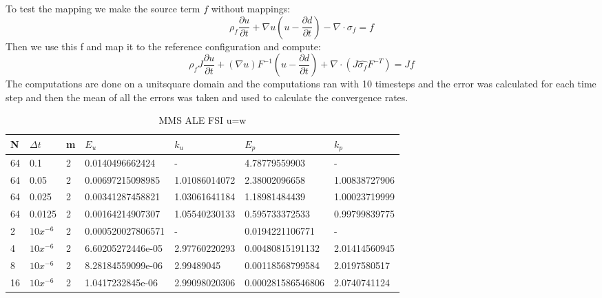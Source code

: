 To test the mapping we make the source term $f$ without mappings:
$$ \rho_f \frac{\partial u}{\partial t}  +  \nabla u (u-\frac{\partial d}{\partial t})  -  \nabla \cdot \sigma_f  = f $$
Then we use this f and map it to the reference configuration and compute:
$$ \rho_f J \frac{\partial u}{\partial t} + (\nabla u)F^{-1}(u-\frac{\partial d}{\partial t})  + \nabla \cdot( J \hat{\sigma_f} F^{-T}) = J f$$
The computations are done on a unitsquare domain and the computations ran with 10 timesteps and the error was calculated for each time step and then the mean of all the errors was taken and used to calculate the convergence rates.
\begin{table}[h!]
\centering
\caption{MMS ALE FSI u=w}
\label{my-label}
\begin{tabular}{|l|l|l|l|l|l|l|}
\hline
N & $\Delta t$ & m & $E_u$ & $k_u$ & $E_p$ & $k_p$ \\ \hline
64 & 0.1 & 2 & 0.0140496662424 & - & 4.78779559903 & - \\ \hline
64 & 0.05 & 2 & 0.00697215098985 & 1.01086014072 & 2.38002096658 & 1.00838727906 \\ \hline
64 & 0.025 & 2 & 0.00341287458821 & 1.03061641184 & 1.18981484439 & 1.00023719999 \\ \hline
64 & 0.0125 & 2 & 0.00164214907307 & 1.05540230133 & 0.595733372533 & 0.99799839775 \\ \hline
2 & $10x^{-6}$ & 2 & 0.000520027806571 & - & 0.0194221106771 & - \\ \hline
4 & $10x^{-6}$ & 2 & 6.60205272446e-05 & 2.97760220293 & 0.00480815191132 & 2.01414560945 \\ \hline
8 & $10x^{-6}$ & 2 & 8.28184559099e-06 & 2.99489045 & 0.00118568799584 & 2.0197580517 \\ \hline
16 & $10x^{-6}$ & 2 & 1.0417232845e-06 & 2.99098020306 & 0.000281586546806 & 2.0740741124 \\ \hline
\end{tabular}
\end{table}





\newpage













